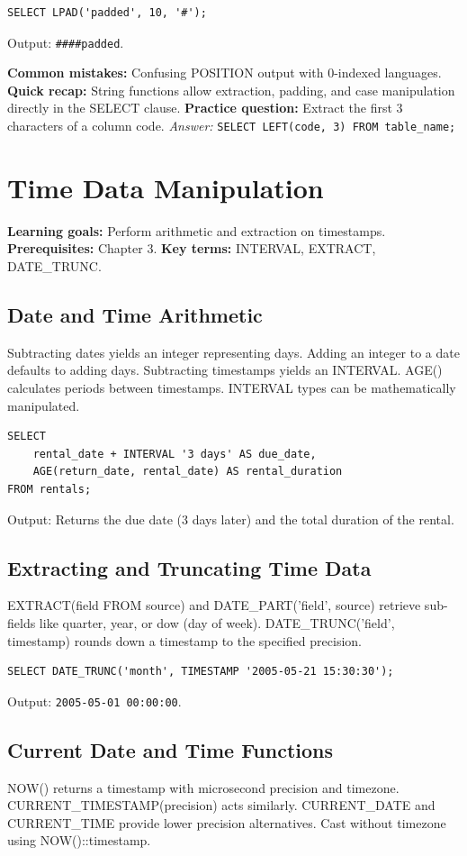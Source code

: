\documentclass[12pt, a4paper]{article}
\begin{document}
\begin{verbatim}
SELECT LPAD('padded', 10, '#');
\end{verbatim}
Output: \texttt{\#\#\#\#padded}.

\textbf{Common mistakes:} Confusing POSITION output with 0-indexed languages.
\textbf{Quick recap:} String functions allow extraction, padding, and case manipulation directly in the SELECT clause.
\textbf{Practice question:} Extract the first 3 characters of a column code.
\textit{Answer:} \texttt{SELECT LEFT(code, 3) FROM table\_name;}

\section{Time Data Manipulation}
\textbf{Learning goals:} Perform arithmetic and extraction on timestamps.
\textbf{Prerequisites:} Chapter 3.
\textbf{Key terms:} INTERVAL, EXTRACT, DATE\_TRUNC.

\subsection{Date and Time Arithmetic}
Subtracting dates yields an integer representing days. Adding an integer to a date defaults to adding days. Subtracting timestamps yields an INTERVAL. AGE() calculates periods between timestamps. INTERVAL types can be mathematically manipulated.

\begin{verbatim}
SELECT 
    rental_date + INTERVAL '3 days' AS due_date,
    AGE(return_date, rental_date) AS rental_duration
FROM rentals;
\end{verbatim}
Output: Returns the due date (3 days later) and the total duration of the rental.

\subsection{Extracting and Truncating Time Data}
EXTRACT(field FROM source) and DATE\_PART('field', source) retrieve sub-fields like quarter, year, or dow (day of week). DATE\_TRUNC('field', timestamp) rounds down a timestamp to the specified precision.

\begin{verbatim}
SELECT DATE_TRUNC('month', TIMESTAMP '2005-05-21 15:30:30');
\end{verbatim}
Output: \texttt{2005-05-01 00:00:00}.

\subsection{Current Date and Time Functions}
NOW() returns a timestamp with microsecond precision and timezone. CURRENT\_TIMESTAMP(precision) acts similarly. CURRENT\_DATE and CURRENT\_TIME provide lower precision alternatives. Cast without timezone using NOW()::timestamp.
\end{document}
